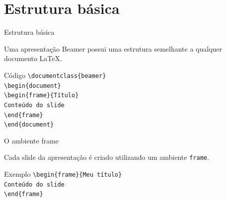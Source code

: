 \documentclass{beamer}
\begin{document}
\section{Estrutura básica}

\begin{frame}{Estrutura básica}

    Uma apresentação Beamer possui uma estrutura semelhante a qualquer documento LaTeX.

    \vspace{0.4cm}

    \begin{block}{Código}
        \texttt{\textbackslash documentclass\{beamer\}}\\[0.2cm]

        \texttt{\textbackslash begin\{document\}}\\[0.2cm]

        \hspace{0.5cm}
        \texttt{\textbackslash begin\{frame\}\{Título\}}\\

        \hspace{1cm}
        \texttt{Conteúdo do slide}\\

        \hspace{0.5cm}
        \texttt{\textbackslash end\{frame\}}\\[0.2cm]

        \texttt{\textbackslash end\{document\}}
    \end{block}

\end{frame}


\begin{frame}{O ambiente frame}

    Cada slide da apresentação é criado utilizando um ambiente
    \texttt{frame}.

    \vspace{0.4cm}

    \begin{block}{Exemplo}
        \texttt{\textbackslash begin\{frame\}\{Meu título\}}\\[0.2cm]

        \hspace{0.5cm}
        \texttt{Conteúdo do slide}\\[0.2cm]

        \texttt{\textbackslash end\{frame\}}
    \end{block}

\end{frame}
\end{document}
